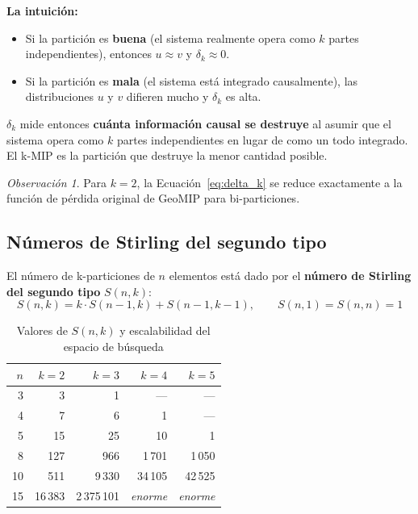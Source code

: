 \documentclass[12pt,letterpaper]{article}
\theoremstyle{definition}
\theoremstyle{remark}
\newtheorem{remark}{Observación}[section]
\newcommand{\Stir}[2]{S(#1,#2)}
\begin{document}
\begin{orangeBox}
\medskip
\textbf{La intuición:}
\begin{itemize}
  \item Si la partición es \textbf{buena} (el sistema realmente opera como $k$ partes
    independientes), entonces $u \approx v$ y $\delta_k \approx 0$.
  \item Si la partición es \textbf{mala} (el sistema está integrado causalmente),
    las distribuciones $u$ y $v$ difieren mucho y $\delta_k$ es alta.
\end{itemize}

$\delta_k$ mide entonces \textbf{cuánta información causal se destruye} al asumir que el
sistema opera como $k$ partes independientes en lugar de como un todo integrado.
El k-MIP es la partición que destruye la menor cantidad posible.
\end{orangeBox}

\begin{remark}
Para $k = 2$, la Ecuación~\eqref{eq:delta_k} se reduce exactamente a la función de
pérdida original de GeoMIP para bi-particiones.
\end{remark}

\subsection{Números de Stirling del segundo tipo}

El número de k-particiones de $n$ elementos está dado por el
\textbf{número de Stirling del segundo tipo} $\Stir{n}{k}$:
\begin{equation}
  \Stir{n}{k} = k \cdot \Stir{n-1}{k} + \Stir{n-1}{k-1}, \qquad
  \Stir{n}{1} = \Stir{n}{n} = 1
  \label{eq:stirling}
\end{equation}

\begin{table}[ht]
\centering
\caption{Valores de $\Stir{n}{k}$ y escalabilidad del espacio de búsqueda}
\label{tab:stirling}
\begin{tabular}{@{}r r r r r@{}}
\toprule
$n$ & $k=2$ & $k=3$ & $k=4$ & $k=5$ \\
\midrule
3  & 3      & 1       & ---       & ---       \\
4  & 7      & 6       & 1         & ---       \\
5  & 15     & 25      & 10        & 1         \\
8  & 127    & 966     & 1\,701    & 1\,050    \\
10 & 511    & 9\,330  & 34\,105   & 42\,525   \\
15 & 16\,383 & 2\,375\,101 & \emph{enorme} & \emph{enorme} \\
\bottomrule
\end{tabular}
\end{table}
\end{document}
